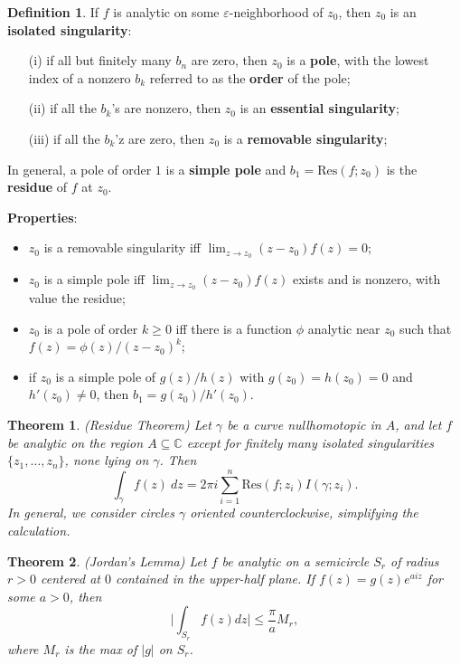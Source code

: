 \documentclass[11pt]{amsart}
\newtheorem*{theorem*}{Theorem}
\theoremstyle{definition}
\newtheorem*{definition*}{Definition}
\renewcommand\geq{\geqslant}
\renewcommand\leq{\leqslant}
\renewcommand\:{\colon}
\newcommand{\C}{\mathds{C}}
\begin{document}
\begin{definition*}
	If $f$ is analytic on some $\varepsilon$-neighborhood of $z_0$, then $z_0$ is an \textbf{isolated singularity}:
	\begin{itemize}[leftmargin=22.5pt]\setlength\itemsep{0em}
		\item[(i)] if all but finitely many $b_n$ are zero, then $z_0$ is a \textbf{pole}, with the lowest index of a nonzero $b_k$ referred to as the \textbf{order} of the pole; 
		\item[(ii)] if all the $b_k$'s are nonzero, then $z_0$ is an \textbf{essential singularity};
		\item[(iii)] if all the $b_k$'z are zero, then $z_0$ is a \textbf{removable singularity};
	\end{itemize}
	In general, a pole of order $1$ is a \textbf{simple pole} and $b_1 = \text{Res}(f; z_0)$ is the \textbf{residue} of $f$ at $z_0$.
\end{definition*}

\noindent \textbf{Properties}:
\begin{itemize}[leftmargin=12.5pt]\setlength\itemsep{0em}
	\item $z_0$ is a removable singularity iff $\lim_{z \to z_0} (z - z_0)f(z) = 0$;
	\item $z_0$ is a simple pole iff $\lim_{z \to z_0} (z - z_0)f(z)$ exists and is nonzero, with value the residue;
	\item $z_0$ is a pole of order $k \geq 0$ iff there is a function $\phi$ analytic near $z_0$ such that $f(z) = \phi(z)/(z - z_0)^k$;
	\item if $z_0$ is a simple pole of $g(z)/h(z)$ with $g(z_0) = h(z_0) = 0$ and $h'(z_0) \neq 0$, then $b_1 = g(z_0)/h'(z_0)$.
\end{itemize}

\begin{theorem*}
	\textnormal{(Residue Theorem)} Let $\gamma$ be a curve nullhomotopic in $A$, and let $f$ be analytic on the region $A \subseteq \C$ except for finitely many isolated singularities $\{z_1, \dots, z_n\}$, none lying on $\gamma$. Then
		\[ \int_\gamma f(z) \ dz = 2\pi i \sum_{i=1}^n \text{Res}(f; z_i)I(\gamma; z_i). \]
	In general, we consider circles $\gamma$ oriented counterclockwise, simplifying the calculation.
\end{theorem*}

\begin{theorem*}
	\textnormal{(Jordan's Lemma)} Let $f$ be analytic on a semicircle $S_r$ of radius $r > 0$ centered at $0$ contained in the upper-half plane. If $f(z) = g(z)e^{aiz}$ for some $a > 0$, then
		\[ \bigg| \int_{S_r} f(z) dz \bigg| \leq \frac{\pi}a M_r, \]
	where $M_r$ is the max of $|g|$ on $S_r$.
\end{theorem*}
\vskip40pt
\end{document}
